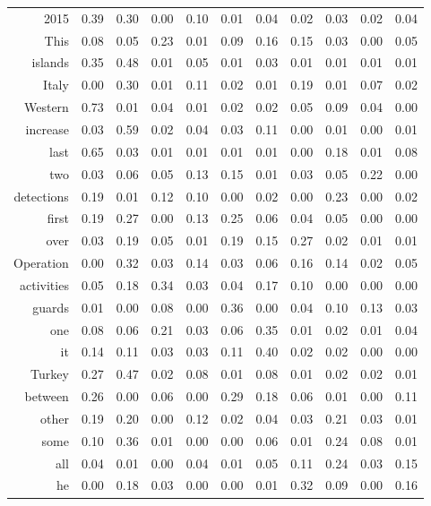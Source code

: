 \begin{longtable}{rrrrrrrrrrr}
  2015 & 0.39 & 0.30 & 0.00 & 0.10 & 0.01 & 0.04 & 0.02 & 0.03 & 0.02 & 0.04 \\ 
  This & 0.08 & 0.05 & 0.23 & 0.01 & 0.09 & 0.16 & 0.15 & 0.03 & 0.00 & 0.05 \\ 
  islands & 0.35 & 0.48 & 0.01 & 0.05 & 0.01 & 0.03 & 0.01 & 0.01 & 0.01 & 0.01 \\ 
  Italy & 0.00 & 0.30 & 0.01 & 0.11 & 0.02 & 0.01 & 0.19 & 0.01 & 0.07 & 0.02 \\ 
  Western & 0.73 & 0.01 & 0.04 & 0.01 & 0.02 & 0.02 & 0.05 & 0.09 & 0.04 & 0.00 \\ 
  increase & 0.03 & 0.59 & 0.02 & 0.04 & 0.03 & 0.11 & 0.00 & 0.01 & 0.00 & 0.01 \\ 
  last & 0.65 & 0.03 & 0.01 & 0.01 & 0.01 & 0.01 & 0.00 & 0.18 & 0.01 & 0.08 \\ 
  two & 0.03 & 0.06 & 0.05 & 0.13 & 0.15 & 0.01 & 0.03 & 0.05 & 0.22 & 0.00 \\ 
  detections & 0.19 & 0.01 & 0.12 & 0.10 & 0.00 & 0.02 & 0.00 & 0.23 & 0.00 & 0.02 \\ 
  first & 0.19 & 0.27 & 0.00 & 0.13 & 0.25 & 0.06 & 0.04 & 0.05 & 0.00 & 0.00 \\ 
  over & 0.03 & 0.19 & 0.05 & 0.01 & 0.19 & 0.15 & 0.27 & 0.02 & 0.01 & 0.01 \\ 
  Operation & 0.00 & 0.32 & 0.03 & 0.14 & 0.03 & 0.06 & 0.16 & 0.14 & 0.02 & 0.05 \\ 
  activities & 0.05 & 0.18 & 0.34 & 0.03 & 0.04 & 0.17 & 0.10 & 0.00 & 0.00 & 0.00 \\ 
  guards & 0.01 & 0.00 & 0.08 & 0.00 & 0.36 & 0.00 & 0.04 & 0.10 & 0.13 & 0.03 \\ 
  one & 0.08 & 0.06 & 0.21 & 0.03 & 0.06 & 0.35 & 0.01 & 0.02 & 0.01 & 0.04 \\ 
  it & 0.14 & 0.11 & 0.03 & 0.03 & 0.11 & 0.40 & 0.02 & 0.02 & 0.00 & 0.00 \\ 
  Turkey & 0.27 & 0.47 & 0.02 & 0.08 & 0.01 & 0.08 & 0.01 & 0.02 & 0.02 & 0.01 \\ 
  between & 0.26 & 0.00 & 0.06 & 0.00 & 0.29 & 0.18 & 0.06 & 0.01 & 0.00 & 0.11 \\ 
  other & 0.19 & 0.20 & 0.00 & 0.12 & 0.02 & 0.04 & 0.03 & 0.21 & 0.03 & 0.01 \\ 
  some & 0.10 & 0.36 & 0.01 & 0.00 & 0.00 & 0.06 & 0.01 & 0.24 & 0.08 & 0.01 \\ 
  all & 0.04 & 0.01 & 0.00 & 0.04 & 0.01 & 0.05 & 0.11 & 0.24 & 0.03 & 0.15 \\ 
  he & 0.00 & 0.18 & 0.03 & 0.00 & 0.00 & 0.01 & 0.32 & 0.09 & 0.00 & 0.16 \\ 

\end{longtable}
